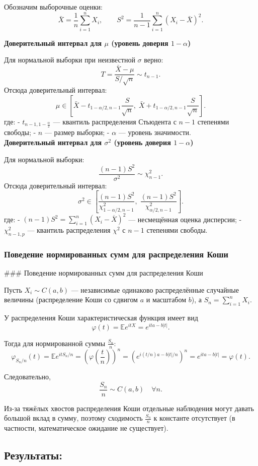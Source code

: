 \documentclass[11pt]{article}
\begin{document}
Обозначим выборочные оценки:
$$
\bar X = \frac{1}{n}\sum_{i=1}^n X_i,\qquad
S^2 = \frac{1}{n-1}\sum_{i=1}^n (X_i-\bar X)^2.
$$

\textbf{Доверительный интервал для $\mu$ (уровень доверия $1-\alpha$)}

Для нормальной выборки при неизвестной $\sigma$ верно:
$$
T=\frac{\bar X-\mu}{S/\sqrt{n}} \sim t_{n-1}.
$$
Отсюда доверительный интервал:
$$
\mu \in \left[\bar X - t_{1-\alpha/2,n-1}\frac{S}{\sqrt{n}},\;
\bar X + t_{1-\alpha/2,n-1}\frac{S}{\sqrt{n}}\right].
$$
где:
- $t_{n-1, 1-\frac{\alpha}{2}}$ — квантиль распределения Стьюдента с $n-1$ степенями свободы;
- $n$ — размер выборки;
- $\alpha$ — уровень значимости.
\\
\textbf{Доверительный интервал для $\sigma^2$ (уровень доверия $1-\alpha$)}

Для нормальной выборки:
$$
\frac{(n-1)S^2}{\sigma^2} \sim \chi^2_{n-1}.
$$
Отсюда доверительный интервал:
$$
\sigma^2 \in
\left[
\frac{(n-1)S^2}{\chi^2_{1-\alpha/2,n-1}},\;
\frac{(n-1)S^2}{\chi^2_{\alpha/2,n-1}}
\right].
$$
где:
- $(n-1)S^2 = \sum_{i=1}^n (X_i - \overline{X})^2$ — несмещённая оценка дисперсии;
- $\chi^2_{n-1, p}$ — квантиль распределения $\chi^2$ с $n-1$ степенями свободы.
\subsubsection{Поведение нормированных сумм для распределения Коши}
### Поведение нормированных сумм для распределения Коши

Пусть $X_i \sim C(a,b)$ — независимые одинаково распределённые случайные величины
(распределение Коши со сдвигом $a$ и масштабом $b$), а $S_n=\sum_{i=1}^n X_i$.

У распределения Коши характеристическая функция имеет вид
$$
\varphi(t)=\mathbb{E}e^{itX}=e^{ita-b|t|}.
$$

Тогда для нормированной суммы $\frac{S_n}{n}$:
$$
\varphi_{S_n/n}(t)=\mathbb{E}e^{itS_n/n}
= \left(\varphi\!\left(\frac{t}{n}\right)\right)^n
= \left(e^{i(t/n)a-b|t|/n}\right)^n
= e^{ita-b|t|}
= \varphi(t).
$$

Следовательно,
$$
\frac{S_n}{n} \sim C(a,b)\quad \forall n.
$$

Из-за тяжёлых хвостов распределения Коши отдельные наблюдения могут давать большой вклад в сумму,
поэтому сходимость $\frac{S_n}{n}$ к константе отсутствует (в частности, математическое ожидание не существует).

\subsection{Результаты:}
\end{document}
